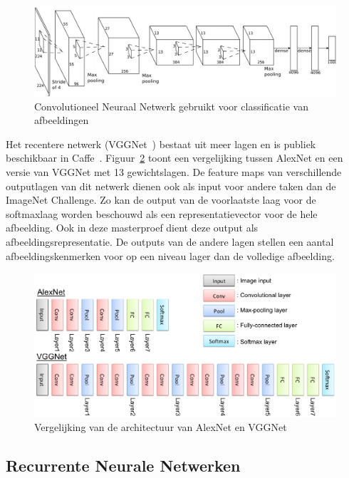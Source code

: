 \begin{figure}[tb]
	\centering
	\includegraphics[width=\linewidth]{Images/cnn.PNG}
	\caption[Convolutioneel Neuraal Netwerk gebruikt voor classificatie van afbeeldingen]{Convolutioneel Neuraal Netwerk gebruikt voor classificatie van afbeeldingen~\cite{Krizhevsky2012a}}
	\label{fig:AlexNet}
\end{figure}

Het recentere netwerk (VGGNet~\cite{Arge2015}) bestaat uit meer lagen en is publiek beschikbaar in Caffe~\cite{Jia2014}.
Figuur~\ref{fig:alexvgg} toont een vergelijking tussen AlexNet en een versie van VGGNet met 13 gewichtslagen. De feature maps van verschillende outputlagen van dit netwerk dienen ook als input voor andere taken dan de ImageNet Challenge. Zo kan de output van de voorlaatste laag voor de softmaxlaag worden beschouwd als een representatievector voor de hele afbeelding. Ook in deze masterproef dient deze output als afbeeldingsrepresentatie. De outputs van de andere lagen stellen een aantal afbeeldingskenmerken voor op een niveau lager dan de volledige afbeelding.

\begin{figure}[tb]
	\centering
	\includegraphics[width=\linewidth]{Images/alex_vgg.eps}
	\caption[Vergelijking van de architectuur van AlexNet en VGGNet]{Vergelijking van de architectuur van AlexNet en VGGNet~\cite{Kataoka}}
	\label{fig:alexvgg}
\end{figure}

\subsection{Recurrente Neurale Netwerken}
